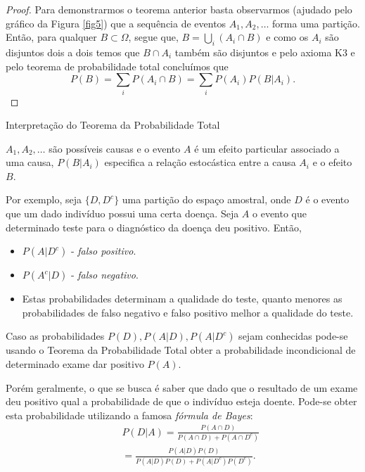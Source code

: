 \begin{frame}
	\begin{proof}
		Para demonstrarmos o teorema anterior basta observarmos (ajudado pelo gráfico da Figura \ref{fig5}) que a sequência de eventos $ A_1, A_2, \ldots $ forma uma partição. Então, para qualquer $ B\subset \Omega $, segue que,  $ B=\displaystyle\bigcup_{i}(A_i\cap B) $ e como os $ A_i $ são disjuntos dois a dois temos que $ B\cap A_i $ também são disjuntos e pelo axioma K3 e pelo teorema de probabilidade total concluímos que
		$$P(B)=\displaystyle \sum_{i}P(A_i\cap B)=\sum_{i}P(A_i)P(B|A_i).$$ 	
\end{proof}
\begin{block}{Interpretação do Teorema da Probabilidade Total}
	
	$A_1,A_2,\ldots$ são possíveis
	causas e o evento $A$ é um efeito particular associado a
	uma causa, $P(B|A_i)$ especifica a relação estocástica entre a causa
	$A_i$ e o efeito $B$.
\end{block}

\end{frame}

\begin{frame}


\begin{exem}
	
	Por exemplo, seja $\{D,D^c\}$ uma partição do espaço amostral, onde $D$ é o evento que um dado indivíduo possui uma certa doença. Seja $A$ o evento que determinado teste para o diagnóstico da doença deu positivo. Então,
	\begin{itemize}
		\item $P(A|D^c)$ - {\em falso positivo}.
		\item $P(A^c|D)$ - {\em falso negativo}.
		\item Estas probabilidades determinam a qualidade do teste, quanto menores as probabilidades de falso negativo e falso positivo melhor a qualidade do teste.
	\end{itemize}
	
	Caso as probabilidades $P(D),P(A|D),P(A|D^c)$ sejam conhecidas pode-se usando o Teorema da Probabilidade Total
	obter a probabilidade incondicional de determinado exame dar positivo $P(A)$.
\end{exem}

Porém geralmente, o que se busca é saber que dado que o resultado de um exame deu positivo qual a probabilidade de
que o indivíduo esteja doente. Pode-se obter esta probabilidade utilizando a famosa {\em fórmula
	de Bayes}:
\begin{eqnarray}
& & P(D|A)=\frac{P(A\cap D)}{P(A\cap D)+P(A\cap D^c)} \nonumber \\
& & = \frac{P(A|D)P(D)}{P(A|D)P(D)+P(A|D^c)P(D^c)}. \nonumber
\end{eqnarray}
\end{frame}



